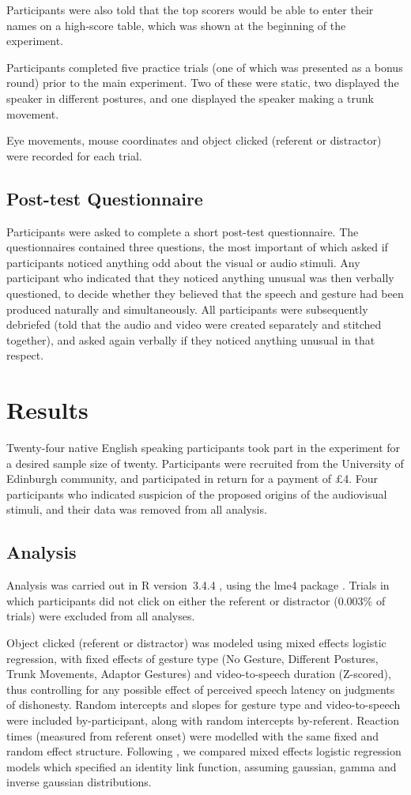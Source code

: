 \documentclass[a4paper,man,natbib]{apa6}
\begin{document}
Participants were also told that the top scorers would be able to enter their names on a high-score table, which was shown at the beginning of the experiment. 

Participants completed five practice trials (one of which was presented as a bonus round) prior to the main experiment. 
Two of these were static, two displayed the speaker in different postures, and one displayed the speaker making a trunk movement.

Eye movements, mouse coordinates and object clicked (referent or distractor) were recorded for each trial.

\subsection{Post-test Questionnaire}
Participants were asked to complete a short post-test questionnaire. 
The questionnaires contained three questions, the most important of which asked if participants noticed anything odd about the visual or audio stimuli.
Any participant who indicated that they noticed anything unusual was then verbally questioned, to decide whether they believed that the speech and gesture had been produced naturally and simultaneously.
All participants were subsequently debriefed (told that the audio and video were created separately and stitched together), and asked again verbally if they noticed anything unusual in that respect. 

\section{Results}
Twenty-four native English speaking participants took part in the experiment for a desired sample size of twenty. 
Participants were recruited from the University of Edinburgh community, and participated in return for a payment of \pounds{}4.
Four participants who indicated suspicion of the proposed origins of the audiovisual stimuli, and their data was removed from all analysis.

\subsection{Analysis}
Analysis was carried out in R version~3.4.4 \citep{Rbase2017}, using the lme4 package \citep{Bates2015}. 
Trials in which participants did not click on either the referent or distractor (0.003\% of trials) were excluded from all analyses. 

Object clicked (referent or distractor) was modeled using mixed effects logistic regression, with fixed effects of gesture type (No Gesture, Different Postures, Trunk Movements, Adaptor Gestures) and video-to-speech duration (Z-scored), thus controlling for any possible effect of perceived speech latency on judgments of dishonesty.
Random intercepts and slopes for gesture type and video-to-speech were included by-participant, along with random intercepts by-referent.
Reaction times (measured from referent onset) were modelled with the same fixed and random effect structure.
Following \citet{Lo2015}, we compared mixed effects logistic regression models which specified an identity link function, assuming gaussian, gamma and inverse gaussian distributions.
\end{document}
